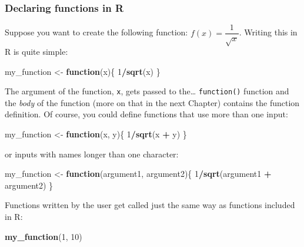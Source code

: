 \documentclass[]{gitbook}
\newenvironment{Shaded}{\begin{snugshade}}{\end{snugshade}}
\newcommand{\ControlFlowTok}[1]{\textcolor[rgb]{0.13,0.29,0.53}{\textbf{#1}}}
\newcommand{\DecValTok}[1]{\textcolor[rgb]{0.00,0.00,0.81}{#1}}
\newcommand{\KeywordTok}[1]{\textcolor[rgb]{0.13,0.29,0.53}{\textbf{#1}}}
\newcommand{\NormalTok}[1]{#1}
\newcommand{\OperatorTok}[1]{\textcolor[rgb]{0.81,0.36,0.00}{\textbf{#1}}}
\newcommand{\StringTok}[1]{\textcolor[rgb]{0.31,0.60,0.02}{#1}}
\begin{document}
\hypertarget{declaring-functions-in-r}{%
\subsubsection{Declaring functions in R}\label{declaring-functions-in-r}}

Suppose you want to create the following function: \(f(x) = \dfrac{1}{\sqrt{x}}\).
Writing this in R is quite simple:

\begin{Shaded}
\begin{Highlighting}[]
\NormalTok{my_function <-}\StringTok{ }\ControlFlowTok{function}\NormalTok{(x)\{}
\DecValTok{1}\OperatorTok{/}\KeywordTok{sqrt}\NormalTok{(x)}
\NormalTok{\}}
\end{Highlighting}
\end{Shaded}

The argument of the function, \texttt{x}, gets passed to the\ldots{} \texttt{function()} function and the \emph{body} of
the function (more on that in the next Chapter) contains the function definition. Of course,
you could define functions that use more than one input:

\begin{Shaded}
\begin{Highlighting}[]
\NormalTok{my_function <-}\StringTok{ }\ControlFlowTok{function}\NormalTok{(x, y)\{}
\DecValTok{1}\OperatorTok{/}\KeywordTok{sqrt}\NormalTok{(x }\OperatorTok{+}\StringTok{ }\NormalTok{y)}
\NormalTok{\}}
\end{Highlighting}
\end{Shaded}

or inputs with names longer than one character:

\begin{Shaded}
\begin{Highlighting}[]
\NormalTok{my_function <-}\StringTok{ }\ControlFlowTok{function}\NormalTok{(argument1, argument2)\{}
\DecValTok{1}\OperatorTok{/}\KeywordTok{sqrt}\NormalTok{(argument1 }\OperatorTok{+}\StringTok{ }\NormalTok{argument2)}
\NormalTok{\}}
\end{Highlighting}
\end{Shaded}

Functions written by the user get called just the same way as functions included in R:

\begin{Shaded}
\begin{Highlighting}[]
\KeywordTok{my_function}\NormalTok{(}\DecValTok{1}\NormalTok{, }\DecValTok{10}\NormalTok{)}
\end{Highlighting}
\end{Shaded}
\end{document}
